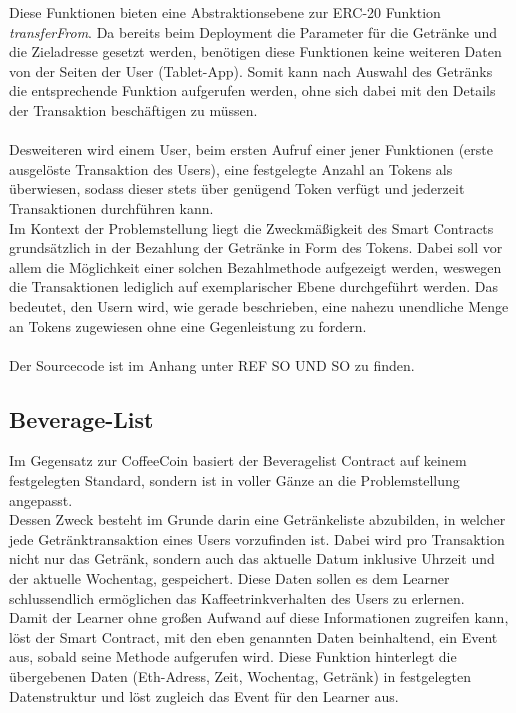 Diese Funktionen bieten eine Abstraktionsebene zur ERC-20 Funktion \textit{transferFrom}. Da bereits beim Deployment die Parameter für die Getränke und die Zieladresse gesetzt werden, benötigen diese Funktionen keine weiteren Daten von der Seiten der User (Tablet-App). Somit kann nach Auswahl des Getränks die entsprechende Funktion aufgerufen werden, ohne sich dabei mit den Details der Transaktion beschäftigen zu müssen.\\\\
Desweiteren wird einem User, beim ersten Aufruf einer jener Funktionen (erste ausgelöste Transaktion des Users), eine festgelegte Anzahl an Tokens als  überwiesen, sodass dieser stets über genügend Token verfügt und jederzeit Transaktionen durchführen kann.\\
Im Kontext der Problemstellung liegt die Zweckmäßigkeit des Smart Contracts grundsätzlich in der Bezahlung der Getränke in Form des Tokens. Dabei soll vor allem die Möglichkeit einer solchen Bezahlmethode aufgezeigt werden, weswegen die Transaktionen lediglich auf exemplarischer Ebene durchgeführt werden. Das bedeutet, den Usern wird, wie gerade beschrieben, eine nahezu unendliche Menge an Tokens zugewiesen ohne eine Gegenleistung zu fordern.\\\\
Der Sourcecode ist im Anhang unter REF SO UND SO zu finden.


\subsection{Beverage-List}
\label{subsec:bl}

Im Gegensatz zur CoffeeCoin basiert der Beveragelist Contract auf keinem festgelegten Standard, sondern ist in voller Gänze an die Problemstellung angepasst.\\
Dessen Zweck besteht im Grunde darin eine Getränkeliste abzubilden, in welcher jede Getränktransaktion eines Users vorzufinden ist. Dabei wird pro Transaktion nicht nur das Getränk, sondern auch das aktuelle Datum inklusive Uhrzeit und der aktuelle Wochentag, gespeichert. Diese Daten sollen es dem Learner schlussendlich ermöglichen das Kaffeetrinkverhalten des Users zu erlernen. \\
Damit der Learner ohne großen Aufwand auf diese Informationen zugreifen kann, löst der Smart Contract, mit den eben genannten Daten beinhaltend, ein Event aus, sobald seine Methode  aufgerufen wird. Diese Funktion 
hinterlegt die übergebenen Daten (Eth-Adress, Zeit, Wochentag, Getränk) in festgelegten Datenstruktur und löst zugleich das Event für den Learner aus.\\\\

